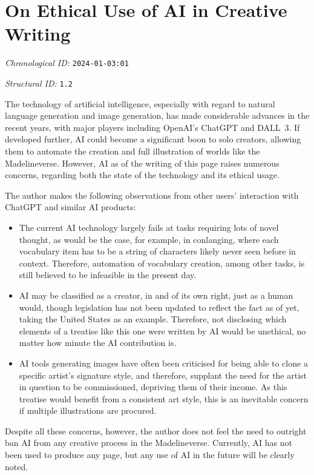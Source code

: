 \section{On Ethical Use of AI in Creative Writing}
\emph{Chronological ID:} \texttt{2024-01-03:01}

\emph{Structural ID:} \texttt{1.2}

The technology of artificial intelligence, especially with regard to natural language generation and image generation, has made considerable advances in the recent years, with major players including OpenAI's ChatGPT and DALL~3. If developed further, AI could become a significant boon to solo creators, allowing them to automate the creation and full illustration of worlds like the Madelineverse. However, AI as of the writing of this page raises numerous concerns, regarding both the state of the technology and its ethical usage.

The author makes the following observations from other users' interaction with ChatGPT and similar AI products:

\begin{itemize}
  \item The current AI technology largely fails at tasks requiring lots of novel thought, as would be the case, for example, in conlanging, where each vocabulary item has to be a string of characters likely never seen before in context. Therefore, automation of vocabulary creation, among other tasks, is still believed to be infeasible in the present day.
  \item AI may be classified as a creator, in and of its own right, just as a human would, though legislation has not been updated to reflect the fact as of yet, taking the United States as an example. Therefore, not disclosing which elements of a treatise like this one were written by AI would be unethical, no matter how minute the AI contribution is.
  \item AI tools generating images have often been criticised for being able to clone a specific artist's signature style, and therefore, supplant the need for the artist in question to be commissioned, depriving them of their income. As this treatise would benefit from a consistent art style, this is an inevitable concern if multiple illustrations are procured.
\end{itemize}

Despite all these concerns, however, the author does not feel the need to outright ban AI from any creative process in the Madelineverse. Currently, AI has not been used to produce any page, but any use of AI in the future will be clearly noted.
\newpage
